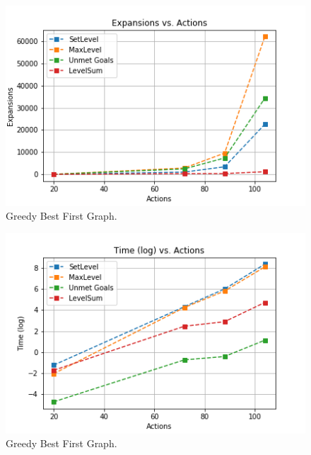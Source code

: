 \documentclass[a4paper]{article}
\begin{document}

\begin{figure}[htpb]
\begin{center}
\includegraphics[width=1\columnwidth]{fig/results_134.png}
\caption{Greedy Best First Graph.}
\end{center}
\label{fig134}
\end{figure}
        


\begin{figure}[htpb]
\begin{center}
\includegraphics[width=1\columnwidth]{fig/results_131.png}
\caption{Greedy Best First Graph.}
\end{center}
\label{fig131}
\end{figure}
        
\end{document}
